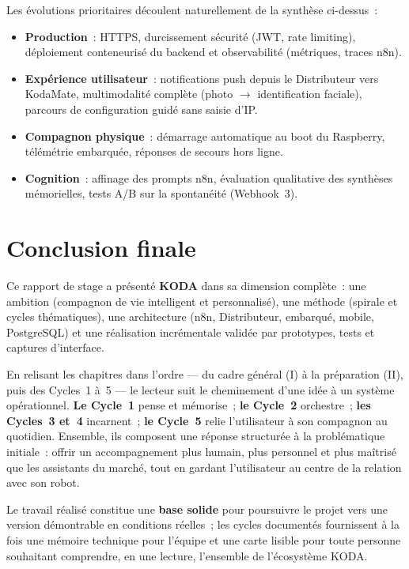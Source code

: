 \documentclass[a4paper,12pt]{report}
\begin{document}
	Les évolutions prioritaires découlent naturellement de la synthèse ci-dessus~:
	\begin{itemize}
		\item \textbf{Production}~: HTTPS, durcissement sécurité (JWT, rate limiting),
		déploiement conteneurisé du backend et observabilité (métriques, traces n8n).
		\item \textbf{Expérience utilisateur}~: notifications push depuis le Distributeur
		vers KodaMate, multimodalité complète (photo $\rightarrow$ identification faciale),
		parcours de configuration guidé sans saisie d'IP.
		\item \textbf{Compagnon physique}~: démarrage automatique au boot du Raspberry,
		télémétrie embarquée, réponses de secours hors ligne.
		\item \textbf{Cognition}~: affinage des prompts n8n, évaluation qualitative des
		synthèses mémorielles, tests A/B sur la spontanéité (Webhook~3).
	\end{itemize}
	
	\section{Conclusion finale}
	
	Ce rapport de stage a présenté \textbf{KODA} dans sa dimension complète~: une
	ambition (compagnon de vie intelligent et personnalisé), une méthode (spirale et
	cycles thématiques), une architecture (n8n, Distributeur, embarqué, mobile,
	PostgreSQL) et une réalisation incrémentale validée par prototypes, tests et
	captures d'interface.
	
	En relisant les chapitres dans l'ordre --- du cadre général (I) à la préparation
	(II), puis des Cycles~1 à~5 --- le lecteur suit le cheminement d'une idée à un
	système opérationnel. \textbf{Le Cycle~1} pense et mémorise~; \textbf{le Cycle~2}
	orchestre~; \textbf{les Cycles~3 et~4} incarnent~; \textbf{le Cycle~5} relie
	l'utilisateur à son compagnon au quotidien. Ensemble, ils composent une réponse
	structurée à la problématique initiale~: offrir un accompagnement plus humain,
	plus personnel et plus maîtrisé que les assistants du marché, tout en gardant
	l'utilisateur au centre de la relation avec son robot.
	
	Le travail réalisé constitue une \textbf{base solide} pour poursuivre le projet
	vers une version démontrable en conditions réelles~; les cycles documentés
	fournissent à la fois une mémoire technique pour l'équipe et une carte lisible
	pour toute personne souhaitant comprendre, en une lecture, l'ensemble de
	l'écosystème KODA.
	
\end{document}
